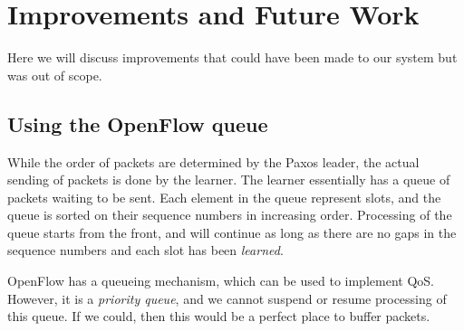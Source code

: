 \chapter{Improvements and Future Work}

Here we will discuss improvements that could have been made to our system
but was out of scope.

\section{Using the OpenFlow queue}

While the order of packets are determined by the Paxos leader, the actual
sending of packets is done by the learner.
%
The learner essentially has a queue of packets waiting to be sent.
%
Each element in the queue represent slots, and the queue is sorted on their
sequence numbers in increasing order.
%
Processing of the queue starts from the front, and will continue as long as
there are no gaps in the sequence numbers and each slot has been
\textit{learned}.

OpenFlow has a queueing mechanism, which can be used to implement \ac{QoS}.
%
However, it is a \textit{priority queue}, and we cannot suspend or resume
processing of this queue.
%
If we could, then this would be a perfect place to buffer packets.

